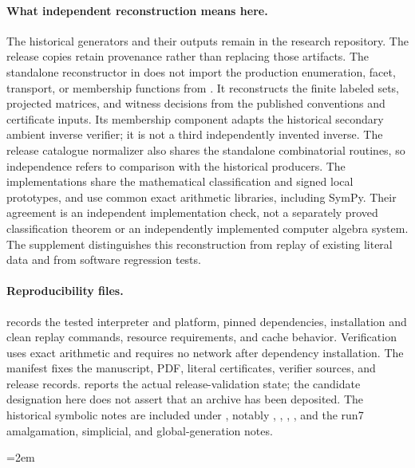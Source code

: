 \documentclass[11pt]{article}
\newcommand{\1}{\mathbf 1}
\begin{document}
\paragraph{What independent reconstruction means here.}
The historical generators and their outputs remain in the research
repository.  The release copies retain provenance rather than replacing
those artifacts.  The standalone reconstructor in  does not
import the production enumeration, facet, transport, or membership
functions from .  It reconstructs the finite labeled sets,
projected matrices, and witness decisions from the published conventions
and certificate inputs.  Its membership component adapts the historical
secondary ambient inverse verifier; it is not a third independently
invented inverse.  The release catalogue normalizer also shares the
standalone combinatorial routines, so independence refers to comparison
with the historical producers.  The implementations share the mathematical
classification and signed local prototypes, and use common exact
arithmetic libraries, including SymPy.  Their agreement is an independent
implementation check, not a separately proved classification theorem or
an independently implemented computer algebra system.  The supplement
distinguishes this reconstruction from replay of existing literal data
and from software regression tests.

\paragraph{Reproducibility files.}
 records the tested interpreter and platform,
pinned dependencies, installation and clean replay commands, resource
requirements, and cache behavior.  Verification uses exact arithmetic
and requires no network after dependency installation.  The manifest
 fixes the manuscript, PDF, literal certificates,
verifier sources, and release records.  
reports the actual release-validation state; the candidate designation
here does not assert that an archive has been deposited.
The historical symbolic notes are included under , notably
,
,
,
, and the run7
amalgamation, simplicial, and global-generation notes.

\begingroup
\emergencystretch=2em
\end{document}
